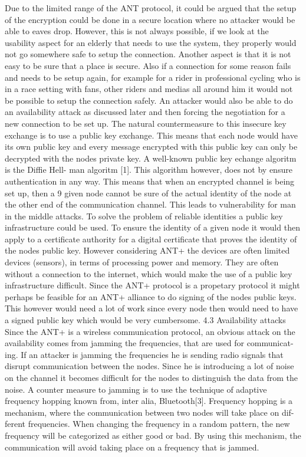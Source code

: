 Due to the limited range of the ANT protocol, it could be argued that the setup of the encryption could be done in a secure location where no attacker would be able to eaves drop. However, this is not always possible, if we look at the usability aspect for an elderly that needs to use the system, they properly would not go somewhere safe to setup the connection. Another aspect is that it is not easy to be sure that a place is secure. Also if a connection for some reason fails and needs to be setup again, for example for a rider in professional cycling who is in a race setting with fans, other riders and medias all around him it would not be possible to setup the connection safely. An attacker would also be able to do an availability attack as discussed later and then forcing the negotiation for a new connection to be set up.
The natural countermeasure to this insecure key exchange is to use a public key exchange. This means that each node would have its own public key and every message encrypted with this public key can only be decrypted with the nodes private key. A well-known public key echange algoritm is the Diffie Hell- man algoritm [1]. This algorithm however, does not by ensure authentication in any way. This means that when an encrypted channel is being set up, then a
9
given node cannot be sure of the actual identity of the node at the other end of the communication channel. This leads to vulnerability for man in the middle attacks. To solve the problem of reliable identities a public key infrastructure could be used. To ensure the identity of a given node it would then apply to a certificate authority for a digital certificate that proves the identity of the nodes public key. However considering ANT+ the devices are often limited devices (sensors), in terms of processing power and memory. They are often without a connection to the internet, which would make the use of a public key infrastructure difficult.
Since the ANT+ protocol is a propetary protocol it might perhaps be feasible for an ANT+ alliance to do signing of the nodes public keys. This however would need a lot of work since every node then would need to have a signed public key which would be very cumbersome.
4.3 Availability attacks
Since the ANT+ is a wireless communication protocol, an obvious attack on the availability comes from jamming the frequencies, that are used for communicat- ing. If an attacker is jamming the frequencies he is sending radio signals that disrupt communication between the nodes. Since he is introducing a lot of noise on the channel it becomes difficult for the nodes to distinguish the data from the noise. A counter measure to jamming is to use the technique of adaptive frequency hopping known from, inter alia, Bluetooth[3]. Frequency hopping is a mechanism, where the communication between two nodes will take place on dif- ferent frequencies. When changing the frequency in a random pattern, the new frequency will be categorized as either good or bad. By using this mechanism, the communication will avoid taking place on a frequency that is jammed.
